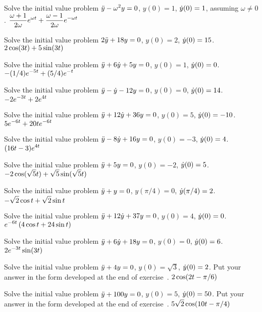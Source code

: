 \exercise Solve the initial value problem $\displaystyle\ddot y-\omega^2y=0$,
$y(0)=1$, $\displaystyle\dot y(0)=1$, assuming $\omega\not=0$.
\answer $\displaystyle {\omega+1\over2\omega}e^{\omega t}+
{\omega-1\over2\omega}e^{-\omega t}$
\endanswer
\endexercise

\exercise Solve the initial value problem $\displaystyle2\ddot y+18y=0$,
$y(0)=2$, $\displaystyle\dot y(0)=15$.
\answer $\displaystyle 2\cos(3t)+5\sin(3t)$
\endanswer

\endexercise

\exercise Solve the initial value problem 
$\displaystyle \ddot y+6\dot y +5y=0$,
$y(0)=1$, $\displaystyle\dot y(0)=0$.
\answer $\displaystyle -(1/4)e^{-5t}+(5/4)e^{-t}$
\endanswer
\endexercise

\exercise Solve the initial value problem 
$\displaystyle\ddot y-\dot y-12y=0$,
$y(0)=0$, $\displaystyle\dot y(0)=14$.
\answer $\displaystyle-2e^{-3t}+2e^{4t}$
\endanswer
\endexercise

\exercise Solve the initial value problem 
$\displaystyle\ddot y+12\dot y+36y=0$,
$y(0)=5$, $\displaystyle\dot y(0)=-10$.
\answer $\displaystyle 5e^{-6t}+20te^{-6t}$
\endanswer
\endexercise

\exercise Solve the initial value problem 
$\displaystyle\ddot y-8\dot y+16y=0$,
$y(0)=-3$, $\displaystyle\dot y(0)=4$.
\answer $\displaystyle (16t-3)e^{4t}$
\endanswer
\endexercise

\exercise Solve the initial value problem 
$\displaystyle\ddot y+5y=0$,
$y(0)=-2$, $\displaystyle\dot y(0)=5$.
\answer $\displaystyle -2\cos(\sqrt5t)+\sqrt{5}\sin(\sqrt{5}t)$
\endanswer
\endexercise

\exercise Solve the initial value problem 
$\displaystyle\ddot y+y=0$,
$y(\pi/4)=0$, $\displaystyle\dot y(\pi/4)=2$.
\answer $\displaystyle -\sqrt2\cos t+\sqrt2\sin t$
\endanswer
\endexercise

\exercise Solve the initial value problem 
$\displaystyle\ddot y+12\dot y+37y=0$,
$y(0)=4$, $\displaystyle\dot y(0)=0$.
\answer $\displaystyle e^{-6t}\left(4\cos t+24\sin t\right)$
\endanswer
\endexercise

\exercise Solve the initial value problem 
$\displaystyle\ddot y+6\dot y+18y=0$,
$y(0)=0$, $\displaystyle\dot y(0)=6$.
\answer $\displaystyle 2e^{-3t}\sin(3t)$
\endanswer
\endexercise

\exercise Solve the initial value problem 
$\displaystyle\ddot y+4y=0$,
$y(0)=\sqrt3$, $\displaystyle\dot y(0)=2$. Put your answer in the form developed
at the end of exercise~.
\answer $\displaystyle 2\cos(2t-\pi/6)$
\endanswer
\endexercise

\exercise Solve the initial value problem 
$\displaystyle\ddot y+100y=0$,
$y(0)=5$, $\displaystyle\dot y(0)=50$. Put your answer in the form developed
at the end of exercise~.
\answer $\displaystyle 5\sqrt2\cos(10t-\pi/4)$
\endanswer
\endexercise

